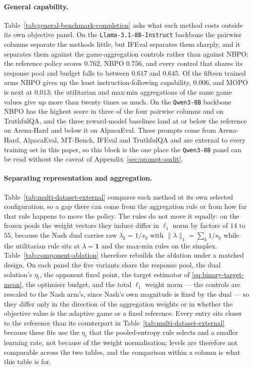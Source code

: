 \documentclass{article}
\theoremstyle{remark}
\theoremstyle{plain}
\newcommand{\NBPO}{\textsc{NBPO}}
\begin{document}
\paragraph{General capability.}
Table~\ref{tab:general-benchmark-completion} asks what each method costs outside its own objective
panel. On the \texttt{Llama-3.1-8B-Instruct} backbone the pairwise columns separate the methods
little, but IFEval separates them sharply, and it separates them against the game-aggregation
controls rather than against \NBPO{}: the reference policy scores $0.762$, \NBPO{} $0.756$, and
every control that shares its response pool and budget falls to between $0.617$ and $0.645$. Of the
fifteen trained arms \NBPO{} gives up the least instruction-following capability, $0.006$, and MOPO
is next at $0.013$; the utilitarian and max-min aggregations of the same game values give up more
than twenty times as much. On the \texttt{Qwen3-8B} backbone \NBPO{} has the highest score in three
of the four pairwise columns and on TruthfulQA, and the three reward-model baselines land at or
below the reference on Arena-Hard and below it on AlpacaEval. These prompts come from Arena-Hard, AlpacaEval, MT-Bench,
IFEval and TruthfulQA and are external to every training set in this paper, so this block is the
one place the \texttt{Qwen3-8B} panel can be read without the caveat of
Appendix~\ref{sec:prompt-audit}.

\paragraph{Separating representation and aggregation.}
Table~\ref{tab:multi-dataset-external} compares each method at its own selected configuration, so a
gap there can come from the aggregation rule or from how far that rule happens to move the policy.
The rules do not move it equally: on the frozen pools the weight vectors they induce differ in
$\ell_1$ norm by factors of $14$ to $55$, because the Nash dual carries raw $\lambda_k=1/s_k$ with
$\|\lambda\|_1=\sum_k 1/s_k$ while the utilitarian rule sits at $\lambda=\mathbf{1}$ and the max-min
rules on the simplex. Table~\ref{tab:component-ablation} therefore rebuilds the ablation under a
matched design. On each panel the five variants share the response pool, the dual solution's
$\eta_t$, the opponent fixed point, the target estimator of \eqref{eq:binary-target-mean}, the
optimiser budget, and the total $\ell_1$ weight norm --- the controls are rescaled to the Nash
arm's, since Nash's own magnitude is fixed by the dual --- so they differ only in the direction of
the aggregation weights or in whether the objective value is the adaptive game or a fixed reference.
Every entry sits closer to the reference than its counterpart in
Table~\ref{tab:multi-dataset-external} because these fits use the $\eta_t$ that the pooled-entropy
rule selects and a smaller learning rate, not because of the weight normalisation; levels are
therefore not comparable across the two tables, and the comparison within a column is what this
table is for.
\end{document}
